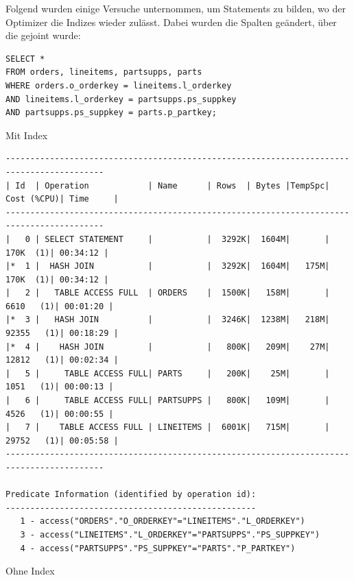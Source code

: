 \documentclass[10pt]{article}
\begin{document}
Folgend wurden einige Versuche unternommen, um Statements zu bilden, wo der Optimizer die Indizes wieder zulässt. Dabei wurden die Spalten geändert, über die gejoint wurde:
\begin{lstlisting}[style=sql]
SELECT *
FROM orders, lineitems, partsupps, parts
WHERE orders.o_orderkey = lineitems.l_orderkey
AND lineitems.l_orderkey = partsupps.ps_suppkey
AND partsupps.ps_suppkey = parts.p_partkey;
\end{lstlisting}
Mit Index
\begin{lstlisting}[style=queryexecutionplan]
------------------------------------------------------------------------------------------
| Id  | Operation            | Name      | Rows  | Bytes |TempSpc| Cost (%CPU)| Time     |
------------------------------------------------------------------------------------------
|   0 | SELECT STATEMENT     |           |  3292K|  1604M|       |   170K  (1)| 00:34:12 |
|*  1 |  HASH JOIN           |           |  3292K|  1604M|   175M|   170K  (1)| 00:34:12 |
|   2 |   TABLE ACCESS FULL  | ORDERS    |  1500K|   158M|       |  6610   (1)| 00:01:20 |
|*  3 |   HASH JOIN          |           |  3246K|  1238M|   218M| 92355   (1)| 00:18:29 |
|*  4 |    HASH JOIN         |           |   800K|   209M|    27M| 12812   (1)| 00:02:34 |
|   5 |     TABLE ACCESS FULL| PARTS     |   200K|    25M|       |  1051   (1)| 00:00:13 |
|   6 |     TABLE ACCESS FULL| PARTSUPPS |   800K|   109M|       |  4526   (1)| 00:00:55 |
|   7 |    TABLE ACCESS FULL | LINEITEMS |  6001K|   715M|       | 29752   (1)| 00:05:58 |
------------------------------------------------------------------------------------------
 
Predicate Information (identified by operation id):
---------------------------------------------------
   1 - access("ORDERS"."O_ORDERKEY"="LINEITEMS"."L_ORDERKEY")
   3 - access("LINEITEMS"."L_ORDERKEY"="PARTSUPPS"."PS_SUPPKEY")
   4 - access("PARTSUPPS"."PS_SUPPKEY"="PARTS"."P_PARTKEY")
\end{lstlisting}
Ohne Index
\end{document}
